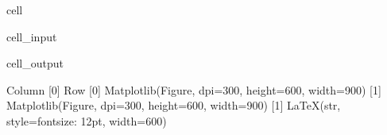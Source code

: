 \documentclass[letterpaper,10pt,english]{jupyterBook}
\begin{document}
\begin{sphinxuseclass}{cell}
\begin{sphinxVerbatimInput}
\begin{sphinxuseclass}{cell_input}
\begin{sphinxVerbatim}[commandchars=\\\{\}]
  

    

    
 
\end{sphinxVerbatim}

\end{sphinxuseclass}\end{sphinxVerbatimInput}
\begin{sphinxVerbatimOutput}

\begin{sphinxuseclass}{cell_output}
\begin{sphinxVerbatim}[commandchars=\\\{\}]
Column
    [0] Row
        [0] Matplotlib(Figure, dpi=300, height=600, width=900)
        [1] Matplotlib(Figure, dpi=300, height=600, width=900)
    [1] LaTeX(str, style=\PYGZob{}\PYGZsq{}font\PYGZhy{}size\PYGZsq{}: \PYGZsq{}12pt\PYGZsq{}\PYGZcb{}, width=600)
\end{sphinxVerbatim}

\end{sphinxuseclass}\end{sphinxVerbatimOutput}

\end{sphinxuseclass}
\end{document}
